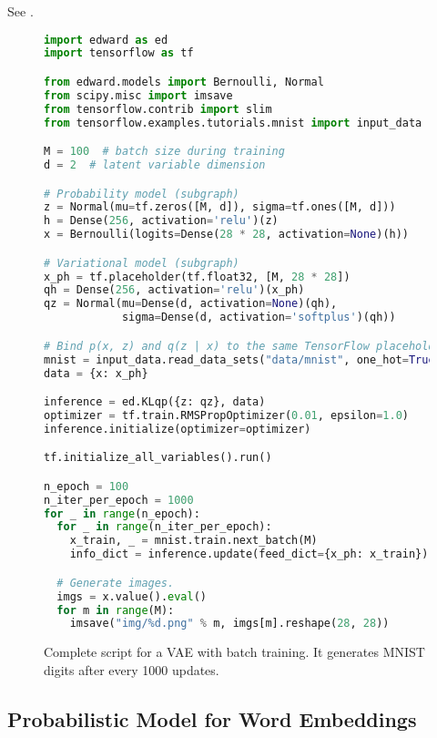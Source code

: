 See .

\begin{figure}[!h]
\begin{lstlisting}[language=python]
import edward as ed
import tensorflow as tf

from edward.models import Bernoulli, Normal
from scipy.misc import imsave
from tensorflow.contrib import slim
from tensorflow.examples.tutorials.mnist import input_data

M = 100  # batch size during training
d = 2  # latent variable dimension

# Probability model (subgraph)
z = Normal(mu=tf.zeros([M, d]), sigma=tf.ones([M, d]))
h = Dense(256, activation='relu')(z)
x = Bernoulli(logits=Dense(28 * 28, activation=None)(h))

# Variational model (subgraph)
x_ph = tf.placeholder(tf.float32, [M, 28 * 28])
qh = Dense(256, activation='relu')(x_ph)
qz = Normal(mu=Dense(d, activation=None)(qh),
            sigma=Dense(d, activation='softplus')(qh))

# Bind p(x, z) and q(z | x) to the same TensorFlow placeholder for x.
mnist = input_data.read_data_sets("data/mnist", one_hot=True)
data = {x: x_ph}

inference = ed.KLqp({z: qz}, data)
optimizer = tf.train.RMSPropOptimizer(0.01, epsilon=1.0)
inference.initialize(optimizer=optimizer)

tf.initialize_all_variables().run()

n_epoch = 100
n_iter_per_epoch = 1000
for _ in range(n_epoch):
  for _ in range(n_iter_per_epoch):
    x_train, _ = mnist.train.next_batch(M)
    info_dict = inference.update(feed_dict={x_ph: x_train})

  # Generate images.
  imgs = x.value().eval()
  for m in range(M):
    imsave("img/%d.png" % m, imgs[m].reshape(28, 28))
\end{lstlisting}
\caption{Complete script for a \gls{VAE}
\citep{kingma2014autoencoding} with batch training.
It generates MNIST digits after every 1000 updates.}
\label{fig:appendix_vae}
\end{figure}

\subsection{Probabilistic Model for Word Embeddings}
\label{appendix:ef_emb}

